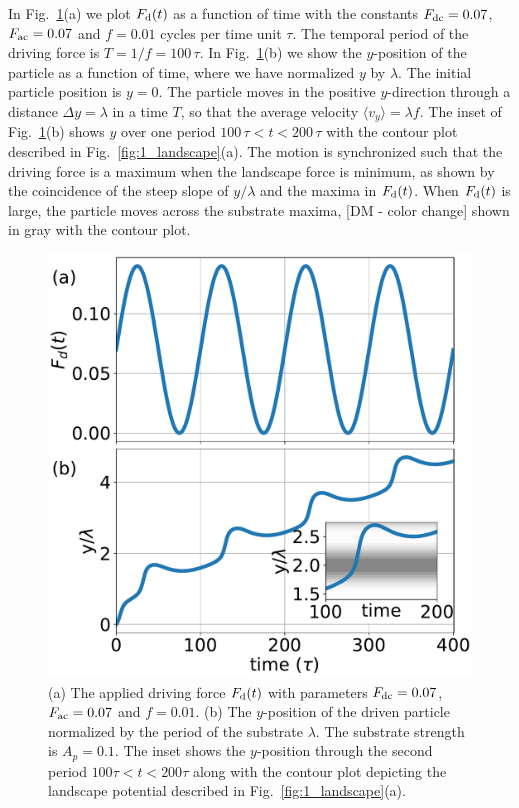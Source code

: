 \documentclass[preprint,showpacs,preprintnumbers,amsmath,amssymb,aps,prb]{revtex4-1}
\theoremstyle{remark}
\begin{document}
In Fig.~\ref{fig:2_Fd_vy_time}(a)
we plot $F_{\rm d}(t)$ 
as a function of time with the
constants $F_{\rm dc}=0.07$, 
$F_{\rm ac}=0.07$ and $f=0.01$ cycles per time unit $\tau$.
The temporal period of the driving force is
$T = 1/f = 100\,\tau$.
In Fig.~\ref{fig:2_Fd_vy_time}(b) 
we show the $y$-position of the particle
as a function of time,
where we have
normalized $y$ by $\lambda$.
The initial particle position is $y = 0$. 
The particle moves
in the positive $y$-direction
through a distance $\Delta y = \lambda$  in a time $T$,
so that  
the average velocity 
$\langle {v}_y \rangle = \lambda f$. 
The inset of Fig.~\ref{fig:2_Fd_vy_time}(b)
shows $y$ 
over one period $100\,\tau < t < 200\,\tau$
with 
the contour plot described
in Fig.~\ref{fig:1_landscape}(a).
The motion is synchronized such that the 
driving force is a maximum when the landscape 
force is minimum,
as shown by the coincidence of the
steep slope of 
$y/\lambda$ 
and the maxima in $F_{\rm d}(t)$.
When $F_{\rm d}(t)$ is large,
the particle moves across the substrate maxima,
[DM - color change]
shown in gray with the contour plot.
\begin{figure}[h]
\centering
\includegraphics[width=\columnwidth]{fig2_Fd_vy_time.pdf}
\caption{(a) The applied driving force $F_{\rm d}(t)$ 
  with parameters $F_{\rm dc} = 0.07$, $F_{\rm ac} = 0.07$ and $f=0.01$.
  (b) 
  The $y$-position of the driven particle
  normalized by the period of the substrate $\lambda$.
  The substrate strength is $A_p=0.1$.
  The inset   shows
  the $y$-position
  through the second period $100\tau<t<200\tau$
 along with the contour plot depicting
  the landscape potential described in Fig.~\ref{fig:1_landscape}(a).
  }
\label{fig:2_Fd_vy_time}
\end{figure}
\end{document}
